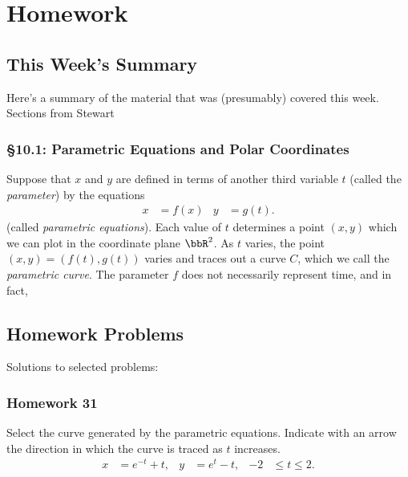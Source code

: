 \chapter{Homework}
\section{This Week's Summary}
Here's a summary of the material that was (presumably) covered this week.
Sections from Stewart
\subsection{\S 10.1: Parametric Equations and Polar Coordinates}
Suppose that $x$ and $y$ are defined in terms of another third variable
$t$ (called the \emph{parameter}) by the equations
\[
\begin{aligned}
x&=f(x)&y&=g(t).
\end{aligned}
\]
(called \emph{parametric equations}). Each value of $t$ determines a point
$(x,y)$ which we can plot in the coordinate plane $\bbR^2$. As $t$ varies,
the point $(x,y)=(f(t),g(t))$ varies and traces out a curve $C$, which we
call the \emph{parametric curve}. The parameter $f$ does not necessarily
represent time, and in fact,

\section{Homework Problems}
Solutions to selected problems:
\subsection{Homework 31}
\begin{problem}[WebAssign HW 31, \# 1]
Select the curve generated by the parametric equations. Indicate with an
arrow the direction in which the curve is traced as $t$ increases.
\[
  \begin{aligned}
    x&=e^{-t}+t,&y&=e^t-t,&-2&\leq t\leq 2.
  \end{aligned}
\]
\end{problem}
\begin{problem}[WebAssign HW 31, \# 2]
\end{problem}
\begin{problem}[WebAssign HW 31, \# 3]
\end{problem}
\begin{problem}[WebAssign HW 31, \# 4]
\end{problem}
\begin{problem}[WebAssign HW 31, \# 5]
\end{problem}
\begin{problem}[WebAssign HW 31, \# 6]
\end{problem}
\begin{problem}[WebAssign HW 31, \# 7]
\end{problem}
\begin{problem}[WebAssign HW 31, \# 8]
\end{problem}
\begin{problem}[WebAssign HW 31, \# 9]
\end{problem}
\begin{problem}[WebAssign HW 31, \# 10]
\end{problem}
